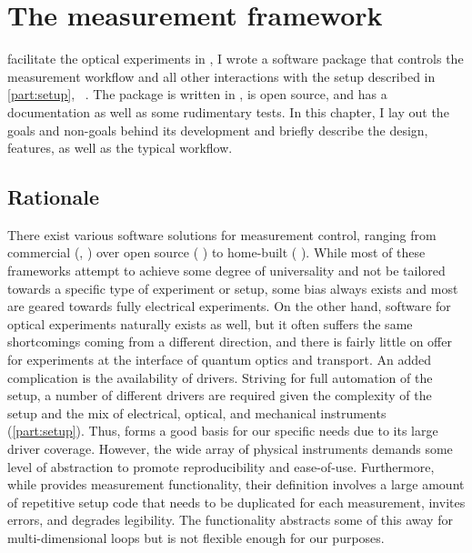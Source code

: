 \chapter{The \mjolnir measurement framework}\label{ch:exp:mjolnir}
 facilitate the optical experiments in \thispart, I wrote a software package that controls the measurement workflow and all other interactions with the setup described in \cref{part:setup}, ~\cite{Hangleiter_mjolnir}.
The package is written in \python, is open source, and has a documentation as well as some rudimentary tests.
In this chapter, I lay out the goals and non-goals behind its development and briefly describe the design, features, as well as the typical workflow.

\section{Rationale}\label{sec:exp:mjolnir:rationale}
There exist various software solutions for measurement control, ranging from commercial (\eg, ) over open source ( ) to home-built ( ).
While most of these frameworks attempt to achieve some degree of universality and not be tailored towards a specific type of experiment or setup, some bias always exists and most are geared towards fully electrical experiments.
On the other hand, software for optical experiments naturally exists as well, but it often suffers the same shortcomings coming from a different direction, and there is fairly little on offer for experiments at the interface of quantum optics and transport.
An added complication is the availability of drivers.
Striving for full automation of the setup, a number of different drivers are required given the complexity of the setup and the mix of electrical, optical, and mechanical instruments (\cref{part:setup}).
Thus, \qcodes forms a good basis for our specific needs due to its large driver coverage.
However, the wide array of physical instruments demands some level of abstraction to promote reproducibility and ease-of-use.
Furthermore, while \qcodes provides measurement functionality, their definition involves a large amount of repetitive setup code that needs to be duplicated for each measurement, invites errors, and degrades legibility.
The  functionality abstracts some of this away for multi-dimensional loops but is not flexible enough for our purposes.

